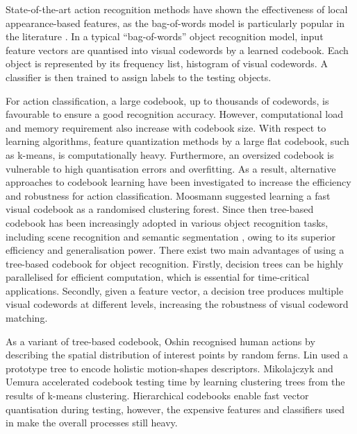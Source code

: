 State-of-the-art action recognition methods have shown the effectiveness of local appearance-based features, as the bag-of-words model is particularly popular in the literature \cite{Dollar2005, Riemenschneider2009, Niebles2008, Schuldt2004, Wong2007}.
In a typical ``bag-of-words'' object recognition model, input feature vectors are quantised into visual codewords by a learned codebook. Each object is represented by its frequency list, \ie histogram of visual codewords. A classifier is then trained to assign labels to the testing objects.

For action classification, a large codebook, \eg up to thousands of codewords, is favourable to ensure a good recognition accuracy. However, computational load and memory requirement also increase with codebook size. With respect to learning algorithms, feature quantization methods by a large flat codebook, such as k-means, is computationally heavy. Furthermore, an oversized codebook is vulnerable to high quantisation errors and overfitting. As a result, alternative approaches to codebook learning have been investigated to increase the efficiency and robustness for action classification. 
Moosmann \etal \cite{Moosmann2007} suggested learning a fast visual codebook as a randomised clustering forest. Since then tree-based codebook has been increasingly adopted in various object recognition tasks, including scene recognition \cite{Bosch2007} and semantic segmentation \cite{Shotton2008}, owing to its superior efficiency and generalisation power.
There exist two main advantages of using a tree-based codebook for object recognition. 
Firstly, decision trees can be highly parallelised for efficient computation, which is essential for time-critical applications. Secondly, given a feature vector, a decision tree produces multiple visual codewords at different levels, increasing the robustness of visual codeword matching. 

As a variant of tree-based codebook, Oshin \etal \cite{Oshin2009} recognised human actions by describing the spatial distribution of interest points by random ferns.  
Lin \etal \cite{Lin2009} used a prototype tree to encode holistic motion-shapes descriptors. 
Mikolajczyk and Uemura \cite{Mikolajczyk2008} accelerated codebook testing time by learning clustering trees from the results of k-means clustering. 
Hierarchical codebooks enable fast vector quantisation during testing, however, the expensive features and classifiers used in \cite{Lin2009, Mikolajczyk2008} make the overall processes still heavy.


